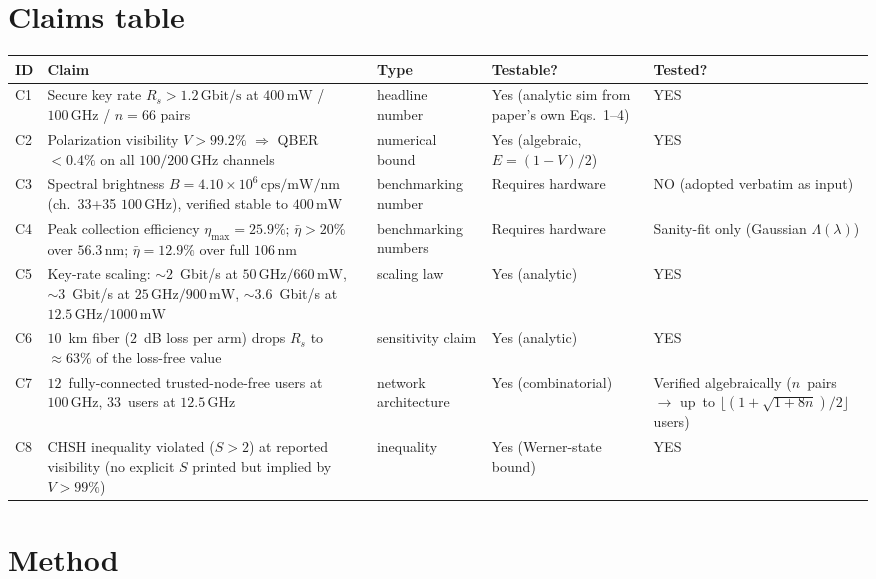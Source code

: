\documentclass[11pt]{article}
\begin{document}
\section{Claims table}
\begin{tabular}{@{}p{}p{}p{}p{}p{}@{}}
\toprule
ID & Claim & Type & Testable? & Tested? \\
\midrule
C1 & Secure key rate $R_s>1.2\,\mathrm{Gbit/s}$ at $400\,\mathrm{mW}$ / $100\,\mathrm{GHz}$ / $n{=}66$ pairs & headline number & Yes (analytic sim from paper's own Eqs.~1--4) & YES \\
C2 & Polarization visibility $V>99.2\%$ $\Rightarrow$ QBER $<0.4\%$ on all $100/200\,\mathrm{GHz}$ channels & numerical bound & Yes (algebraic, $E=(1-V)/2$) & YES \\
C3 & Spectral brightness $B=4.10\times10^{6}\,\mathrm{cps/mW/nm}$ (ch.~33+35 $100\,\mathrm{GHz}$), verified stable to $400\,\mathrm{mW}$ & benchmarking number & Requires hardware & NO (adopted verbatim as input) \\
C4 & Peak collection efficiency $\eta_{\max}=25.9\%$; $\bar\eta{>}20\%$ over $56.3\,\mathrm{nm}$; $\bar\eta{=}12.9\%$ over full $106\,\mathrm{nm}$ & benchmarking numbers & Requires hardware & Sanity-fit only (Gaussian $\Lambda(\lambda)$) \\
C5 & Key-rate scaling: $\sim2$~Gbit/s at $50\,\mathrm{GHz}/660\,\mathrm{mW}$, $\sim3$~Gbit/s at $25\,\mathrm{GHz}/900\,\mathrm{mW}$, $\sim3.6$~Gbit/s at $12.5\,\mathrm{GHz}/1000\,\mathrm{mW}$ & scaling law & Yes (analytic) & YES \\
C6 & $10$~km fiber ($2$~dB loss per arm) drops $R_s$ to $\approx63\%$ of the loss-free value & sensitivity claim & Yes (analytic) & YES \\
C7 & $12$~fully-connected trusted-node-free users at $100\,\mathrm{GHz}$, $33$~users at $12.5\,\mathrm{GHz}$ & network architecture & Yes (combinatorial) & Verified algebraically ($n$~pairs $\to$ up~to $\lfloor(1+\sqrt{1+8n})/2\rfloor$ users) \\
C8 & CHSH inequality violated ($S>2$) at reported visibility (no explicit $S$ printed but implied by $V>99\%$) & inequality & Yes (Werner-state bound) & YES \\
\bottomrule
\end{tabular}

\section{Method}
\end{document}
